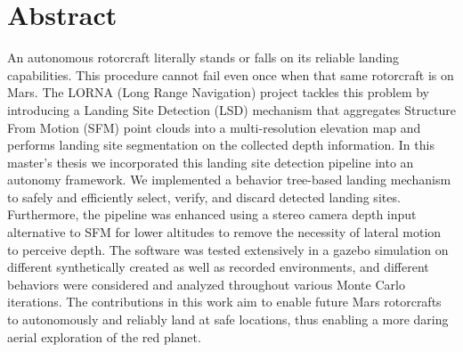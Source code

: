 \chapter*{Abstract}

An autonomous rotorcraft literally stands or falls on its reliable landing capabilities. This procedure cannot fail even once when that same rotorcraft is on Mars. The LORNA (Long Range Navigation) project tackles this problem by introducing a Landing Site Detection (LSD) mechanism that aggregates Structure From Motion (SFM) point clouds into a multi-resolution elevation map and performs landing site segmentation on the collected depth information. In this master's thesis we incorporated this landing site detection pipeline into an autonomy framework. We implemented a behavior tree-based landing mechanism to safely and efficiently select, verify, and discard detected landing sites. Furthermore, the pipeline was enhanced using a stereo camera depth input alternative to SFM for lower altitudes to remove the necessity of lateral motion to perceive depth. The software was tested extensively in a gazebo simulation on different synthetically created as well as recorded environments, and different behaviors were considered and analyzed throughout various Monte Carlo iterations. The contributions in this work aim to enable future Mars rotorcrafts to autonomously and reliably land at safe locations, thus enabling a more daring aerial exploration of the red planet.